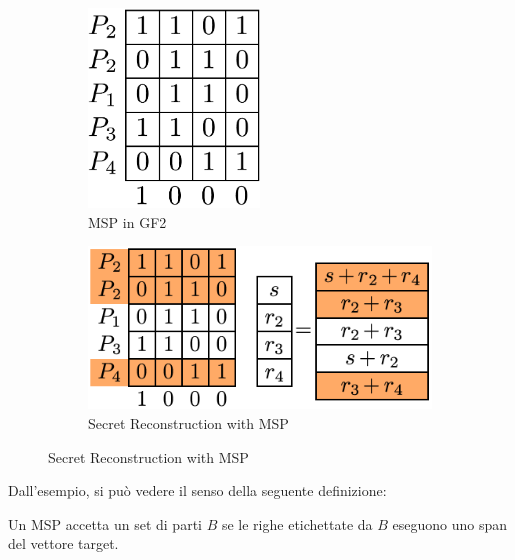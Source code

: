 \begin{figure}[h]
    \begin{subfigure}[b]{0.48\textwidth}
        \centering
        \includegraphics[width=0.5\textwidth]{image/lsss/gf2.png}
        \caption{MSP in GF2}
        \label{fig:mspgf2}    
    \end{subfigure}\hfill
    \begin{subfigure}[b]{0.48\textwidth}        
        \centering
        \includegraphics[width=\textwidth]{image/lsss/gf2ss.png}
        \caption{Secret Reconstruction with MSP}
        \label{fig:mspss}
    \end{subfigure}
\end{figure}
Dall'esempio, si può vedere il senso della seguente definizione:
\begin{definition}\label{def:mspacc}
Un MSP accetta un set di parti $B$ se le righe etichettate da $B$ eseguono uno span del vettore target.
\end{definition}
